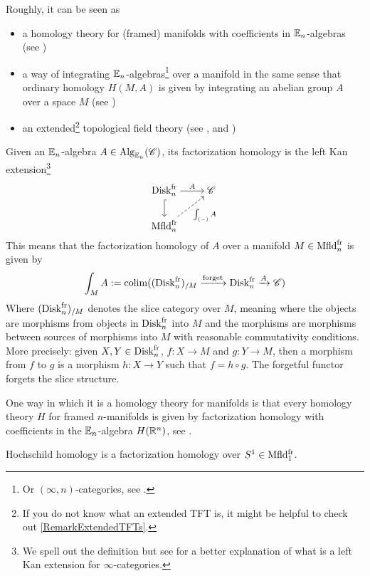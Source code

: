 Roughly, it can be seen as 
\begin{itemize}
\item a homology theory for (framed) manifolds with coefficients in $\mathbb{E}_n$-algebras (see
 \cite{Ayalatopological_2015})
\item a way of integrating $\mathbb{E}_n$-algebras\footnote{Or $(\infty,n)$-categories, see
 \cite{ayalacategories2020factorization}.} over a manifold in the same sense that ordinary
 homology $H(M,A)$ is given by integrating an abelian group $A$ over a space $M$
  (see \cite{Ayalatopological_2015})
 \item an extended\footnote{If you do not know what an extended TFT is, it might be helpful
 to check out \ref{RemarkExtendedTFTs}.} topological field theory (see \cite{Scheimbauer:2014zty},
  \cite[4.1]{lurie2009classification} and
  \cite{Ayalatopological_2015})
\end{itemize}

\begin{defn}\label{FactorHomology}
    Given an $\mathbb{E}_n$-algebra $A\in\operatorname{Alg}_{\mathbb{E}_{n}}(\mathscr{C})$, its factorization homology is the left Kan
     extension\footnote{We spell out the definition but see \cite[Section 3.6.1]{Tanaka_2020} for a better explanation of what is a left
         Kan extension for $\infty$-categories.}
    \[\begin{tikzcd}[cramped]
        {\operatorname{Disk}^{\fr}_{n}} & \cat \\
        {\operatorname{Mfld}^{\fr}_{n}}
        \arrow[hook, from=1-1, to=2-1]
        \arrow["A", from=1-1, to=1-2]
        \arrow["{\int_{(-)}A}"', dashed, from=2-1, to=1-2]
    \end{tikzcd}\]
    This means that the factorization homology of $A$ over a manifold
     $M\in\operatorname{Mfld}_{n}^{\operatorname{fr}}$ is given by 
     $$\int_M A:=\operatorname{colim}((\operatorname{Disk}_{n}^{\operatorname{fr}})_{/M}\xrightarrow{\operatorname{forget}}\operatorname{Disk}_{n}^{\operatorname{fr}}\xrightarrow{A}\mathscr{C})$$
     Where $(\operatorname{Disk}_{n}^{\operatorname{fr}})_{/M}$ denotes the slice category over $M$, meaning where the objects are
     morphisms from objects in $\operatorname{Disk}_{n}^{\operatorname{fr}}$ into $M$ and the morphisms are morphisms
     between sources of morphisms into $M$ with reasonable commutativity conditions. More
     precisely: given $X,Y\in\operatorname{Disk}_{n}^{\operatorname{fr}}$, $f:X\to M$ and $g:Y\to M$, then a morphism from
     $f$ to $g$ is a morphism $h:X\to Y$ such that $f=h\circ g$. The forgetful functor forgets the slice 
     structure.
\end{defn}
One way in which it is a homology theory for manifolds is that every homology theory $H$ for framed
 $n$-manifolds is given by factorization homology with coefficients in the $\mathbb{E}_n$-algebra $H(\mathbb{R}^n)$,
 see \cite{Ayalatopological_2015}.
 \begin{ex}
    Hochschild homology is a factorization homology over $S^1\in\operatorname{Mfld_{1}^{\operatorname{fr}}}$.
 \end{ex}

